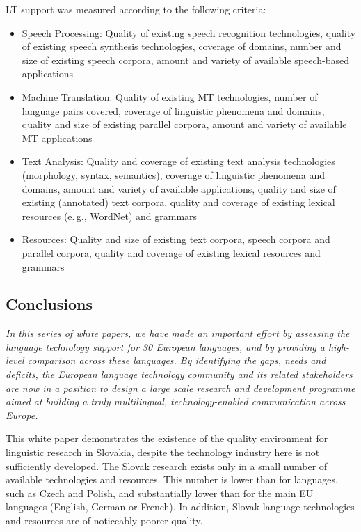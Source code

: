 \begin{multicols}{2}
LT support was measured according to the following criteria:
\begin{itemize}
\item Speech Processing: Quality of existing speech recognition technologies, quality of existing speech synthesis technologies, coverage of domains, number and size of existing speech corpora, amount and variety of available speech-based applications
\item Machine Translation: Quality of existing MT technologies, number of language pairs covered, coverage of linguistic phenomena and domains, quality and size of existing parallel corpora, amount and variety of available MT applications
\item Text Analysis: Quality and coverage of existing text analysis technologies (morphology, syntax, semantics), coverage of linguistic phenomena and domains, amount and variety of available applications, quality and size of existing (annotated) text corpora, quality and coverage of existing lexical resources (e.\,g., WordNet) and grammars
\item Resources: Quality and size of existing text corpora, speech corpora and parallel corpora, quality and coverage of existing lexical resources and grammars
\end{itemize} 

\subsection{Conclusions}
\emph{In this series of white papers, we have made an important effort by assessing the language technology support for 30 European languages, and by providing a high-level comparison across these languages. By identifying the gaps, needs and deficits, the European language technology community and its related stakeholders are now in a position to design a large scale research and development programme aimed at building a truly multilingual, technology-enabled communication across Europe.}

This white paper demonstrates the existence of the quality environment for
linguistic research in Slovakia, despite the technology industry here is not
sufficiently developed. The Slovak research exists only in a small number of
available technologies and resources. This number is lower than for languages,
such as Czech and Polish, and substantially lower than for the main EU
languages (English, German or French). In addition, Slovak language
technologies and resources are of noticeably poorer quality.


\end{multicols}
